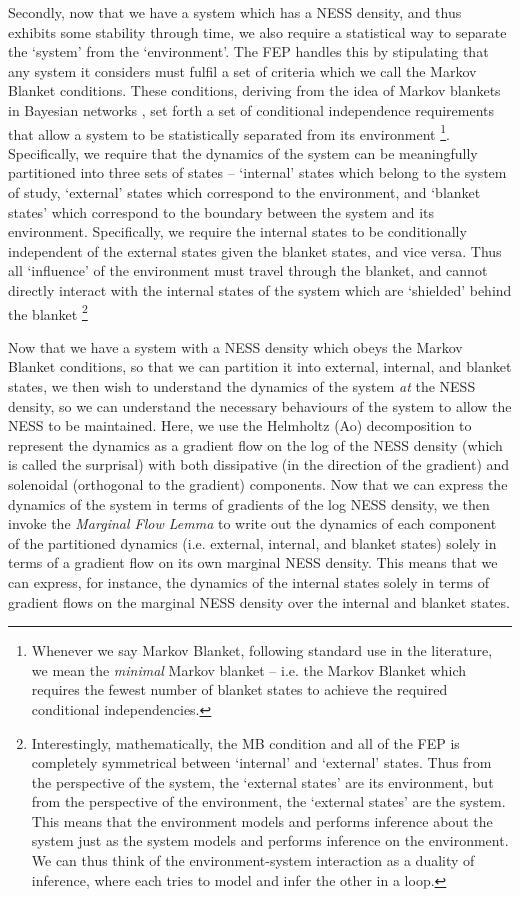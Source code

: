 Secondly, now that we have a system which has a NESS density, and thus exhibits some stability through time, we also require a statistical way to separate the `system' from the `environment'. The FEP handles this by stipulating that any system it considers must fulfil a set of criteria which we call the Markov Blanket conditions. These conditions, deriving from the idea of Markov blankets in Bayesian networks \citep{pearl2011bayesian,pearl2014probabilistic}, set forth a set of conditional independence requirements that allow a system to be statistically separated from its environment \footnote{Whenever we say Markov Blanket, following standard use in the literature, we mean the \emph{minimal} Markov blanket -- i.e. the Markov Blanket which requires the fewest number of blanket states to achieve the required conditional independencies.}. Specifically, we require that the dynamics of the system can be meaningfully partitioned into three sets of states -- `internal' states which belong to the system of study, `external' states which correspond to the environment, and `blanket states' which correspond to the boundary between the system and its environment. Specifically, we require the internal states to be conditionally independent of the external states given the blanket states, and vice versa. Thus all `influence' of the environment must travel through the blanket, and cannot directly interact with the internal states of the system which are `shielded' behind the blanket \footnote{Interestingly, mathematically, the MB condition and all of the FEP is completely symmetrical between `internal' and `external' states. Thus from the perspective of the system, the `external states' are its environment, but from the perspective of the environment, the `external states' are the system. This means that the environment models and performs inference about the system just as the system models and performs inference on the environment. We can thus think of the environment-system interaction as a duality of inference, where each tries to model and infer the other in a loop.}

Now that we have a system with a NESS density which obeys the Markov Blanket conditions, so that we can partition it into external, internal, and blanket states, we then wish to understand the dynamics of the system \emph{at} the NESS density, so we can understand the necessary behaviours of the system to allow the NESS to be maintained. Here, we use the Helmholtz (Ao) decomposition \citep{yuan2017sde,yuan2011potential,yuan2012beyond} to represent the dynamics as a gradient flow on the log of the NESS density (which is called the surprisal) with both dissipative (in the direction of the gradient) and solenoidal (orthogonal to the gradient) components. Now that we can express the dynamics of the system in terms of gradients of the log NESS density, we then invoke the \emph{Marginal Flow Lemma} to write out the dynamics of each component of the partitioned dynamics (i.e. external, internal, and blanket states) solely in terms of a gradient flow on its own marginal NESS density. This means that we can express, for instance, the dynamics of the internal states solely in terms of gradient flows on the marginal NESS density over the internal and blanket states.

